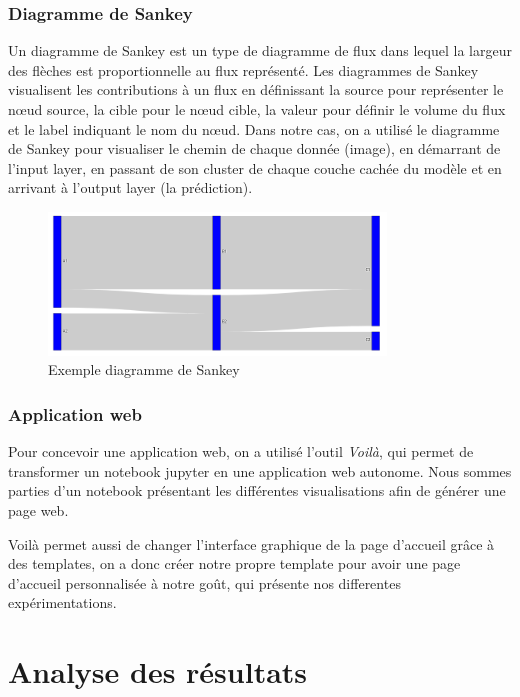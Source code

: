 \documentclass[oneside,13pt,a4paper]{report}
\begin{document}
\subsection{Diagramme de Sankey}
Un diagramme de Sankey est un type de diagramme de flux dans lequel la largeur des flèches est proportionnelle au flux représenté. 
Les diagrammes de Sankey visualisent les contributions à un flux en définissant la source pour représenter le nœud source, la cible pour le nœud cible, la valeur pour définir le volume du flux et le label indiquant le nom du nœud. Dans notre cas, on a utilisé le diagramme de Sankey pour visualiser le chemin de chaque donnée (image), en démarrant de l'input layer, en passant de son cluster de chaque couche cachée du modèle et en arrivant à l'output layer (la prédiction).

\begin{figure}[!h]
	\center
	\includegraphics[width=0.8\textwidth]{img/sankey.png}
	\caption{Exemple diagramme de Sankey}
\end{figure}

\subsection{Application web}
Pour concevoir une application web, on a utilisé l'outil \textit{Voilà}, qui permet de transformer un notebook jupyter en une application web autonome. Nous sommes parties d'un notebook présentant les différentes visualisations afin de générer une page web.




Voilà permet aussi de changer l'interface graphique de la page d'accueil grâce à des templates, on a donc créer notre propre template pour avoir une page d'accueil personnalisée à notre goût, qui présente nos differentes expérimentations.



\chapter{Analyse des résultats}
\end{document}
